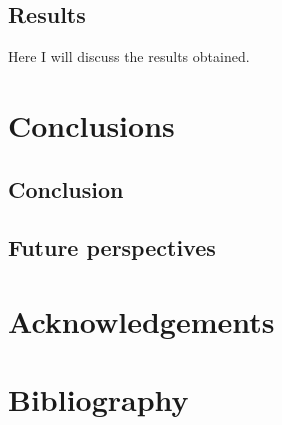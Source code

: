 \documentclass[a4paper,10pt]{report}
\begin{document}
\section{Results}

Here I will discuss the results obtained.

\chapter{Conclusions}
\section{Conclusion}
\section{Future perspectives}

\chapter*{Acknowledgements}

\chapter*{Bibliography}
\end{document}
